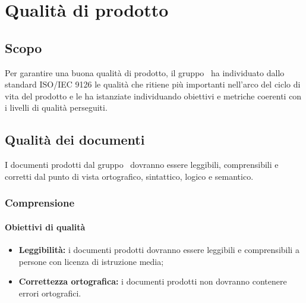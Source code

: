 \documentclass[PianoDiQualifica.tex]{subfiles}
\begin{document}
\chapter{Qualità di prodotto}

\section{Scopo}
Per garantire una buona qualità di prodotto, il gruppo \gruppo\ ha individuato dallo standard ISO/IEC 9126 le qualità che ritiene più importanti nell’arco del ciclo di vita del prodotto e le ha istanziate individuando obiettivi e metriche coerenti con i livelli di qualità perseguiti.

\section{Qualità dei documenti}
I documenti prodotti dal gruppo \gruppo\ dovranno essere leggibili, comprensibili e corretti dal punto di vista ortografico, sintattico, logico e semantico.
\subsection{Comprensione}
\subsubsection{Obiettivi di qualità}
\begin{itemize}
	\item \textbf{Leggibilità:} i documenti prodotti dovranno essere leggibili e comprensibili a persone con licenza di istruzione media;
	\item \textbf{Correttezza ortografica:} i documenti prodotti non dovranno contenere errori ortografici.
\end{itemize}
\end{document}
